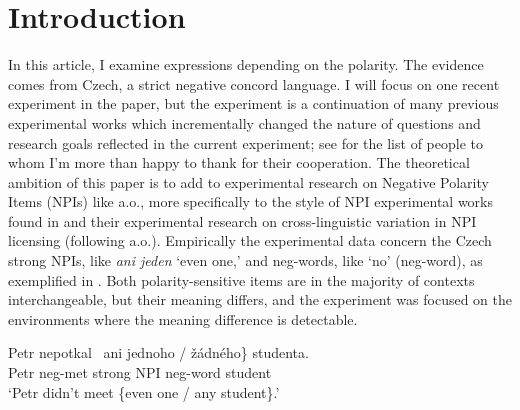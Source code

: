 \section{Introduction}\label{intro}

In this article, I examine expressions depending on the polarity. The evidence comes from Czech, a strict negative concord language. I will focus on one recent experiment in the paper, but the experiment is a continuation of many previous experimental works which incrementally changed the nature of questions and research goals reflected in the current experiment; see  for the list of people to whom I'm more than happy to thank for their cooperation. The theoretical ambition of this paper is to add to experimental research on Negative Polarity Items (NPIs) like \citet{Chemla-Homer-Rothschild-NPI,gajewski2016another,alexandropoulou2020there} a.o., more specifically to the style of NPI experimental works found in \citet{djarv2018cognitive,schwarz2020italian} and their experimental research on cross-linguistic variation in NPI licensing (following \citealt{chierchia2019factivity} a.o.). Empirically the experimental data concern the Czech strong NPIs, like \emph{ani jeden} `even one,' and neg-words, like `no' (neg-word), as exemplified in . Both polarity-sensitive items are in the majority of contexts interchangeable, but their meaning differs, and the experiment was focused on the environments where the meaning difference is detectable.


\ea\label{ex-1}\gll Petr nepotkal \minsp{\{}\ ani jednoho / žádného\} studenta.\\
Petr neg-met strong NPI {} neg-word student\\
\glt `Petr didn't meet \{even one / any student\}.'
\z

